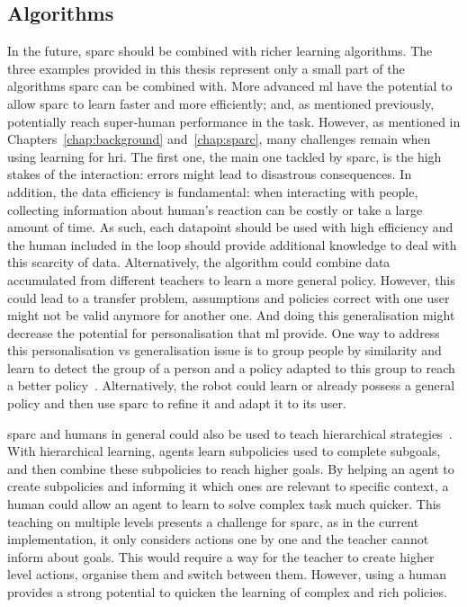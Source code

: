 \subsection{Algorithms}

In the future, \gls{sparc} should be combined with richer learning algorithms. The three examples provided in this thesis represent only a small part of the algorithms \gls{sparc} can be combined with. More advanced \gls{ml} have the potential to allow \gls{sparc} to learn faster and more efficiently; and, as mentioned previously, potentially reach super-human performance in the task. However, as mentioned in Chapters~\ref{chap:background} and~\ref{chap:sparc}, many challenges remain when using learning for \gls{hri}. The first one, the main one tackled by \gls{sparc}, is the high stakes of the interaction: errors might lead to disastrous consequences. In addition, the data efficiency is fundamental: when interacting with people, collecting information about human's reaction can be costly or take a large amount of time. As such, each datapoint should be used with high efficiency and the human included in the loop should provide additional knowledge to deal with this scarcity of data. Alternatively, the algorithm could combine data accumulated from different teachers to learn a more general policy. However, this could lead to a transfer problem, assumptions and policies correct with one user might not be valid anymore for another one. And doing this generalisation might decrease the potential for personalisation that \gls{ml} provide. One way to address this personalisation vs generalisation issue is to group people by similarity and learn to detect the group of a person and a policy adapted to this group to reach a better policy~\citep{brunskill2014pac}. Alternatively, the robot could learn or already possess a general policy and then use \gls{sparc} to refine it and adapt it to its user. 

\gls{sparc} and humans in general could also be used to teach hierarchical strategies~\citep{botvinick2012hierarchical}. With hierarchical learning, agents learn subpolicies used to complete subgoals, and then combine these subpolicies to reach higher goals. By helping an agent to create subpolicies and informing it which ones are relevant to specific context, a human could allow an agent to learn to solve complex task much quicker. This teaching on multiple levels presents a challenge for \gls{sparc}, as in the current implementation, it only considers actions one by one and the teacher cannot inform about goals. This would require a way for the teacher to create higher level actions, organise them and switch between them. However, using a human provides a strong potential to quicken the learning of complex and rich policies.

